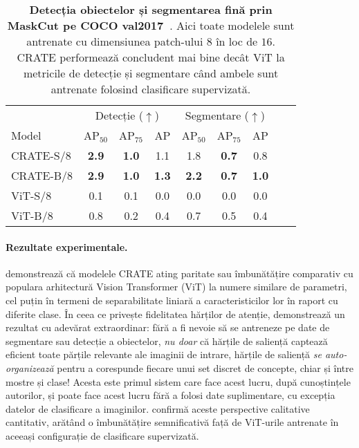 \documentclass[../../book-main_ro.tex]{subfiles}
\begin{document}
\begin{table}
    \centering
    \begin{tabular}{@{}lcccccccc@{}}
    \toprule
     &  \multicolumn{3}{c}{Detecție (\(\uparrow\))} &  \multicolumn{3}{c}{Segmentare (\(\uparrow\))} \\ 
    Model & AP$_{50}$ & AP$_{75}$ & AP & AP$_{50}$ & AP$_{75}$ & AP  \\ 
    \midrule
    CRATE-S/8 & \textbf{2.9} & \textbf{1.0} & 1.1 & 1.8 & \textbf{0.7} & 0.8 \\
    CRATE-B/8 & \textbf{2.9} & \textbf{1.0} & \textbf{1.3} & \textbf{2.2} & \textbf{0.7} & \textbf{1.0} \\
    ViT-S/8 & 0.1& 0.1 & 0.0 & 0.0 & 0.0 & 0.0 \\
    ViT-B/8 & 0.8 & 0.2 & 0.4 & 0.7 & 0.5 & 0.4 \\
    \bottomrule
    \end{tabular}
    \caption{\small \textbf{Detecția obiectelor și segmentarea fină prin MaskCut pe COCO {val2017}~\citep{lin2014microsoft}}. Aici toate modelele sunt antrenate cu dimensiunea patch-ului \(8\) în loc de \(16\). CRATE performează concludent mai bine decât ViT la metricile de detecție și segmentare când ambele sunt antrenate folosind clasificare supervizată.}
    \label{tab:crate_detection_segmentation}
\end{table}


\paragraph{Rezultate experimentale.} 

 demonstrează că modelele CRATE ating paritate sau îmbunătățire comparativ cu populara arhitectură Vision Transformer (ViT) la numere similare de parametri, cel puțin în termeni de separabilitate liniară a caracteristicilor lor în raport cu diferite clase. În ceea ce privește fidelitatea hărților de atenție,  demonstrează un rezultat cu adevărat extraordinar: fără a fi nevoie să se antreneze pe date de segmentare sau detecție a obiectelor, \textit{nu doar} că hărțile de saliență captează eficient toate părțile relevante ale imaginii de intrare, hărțile de saliență \textit{se auto-organizează} pentru a corespunde fiecare unui set discret de concepte, chiar și între mostre și clase! Acesta este primul sistem care face acest lucru, după cunoștințele autorilor, și poate face acest lucru fără a folosi date suplimentare, cu excepția datelor de clasificare a imaginilor.  confirmă aceste perspective calitative cantitativ, arătând o îmbunătățire semnificativă față de ViT-urile antrenate în aceeași configurație de clasificare supervizată.
\end{document}
